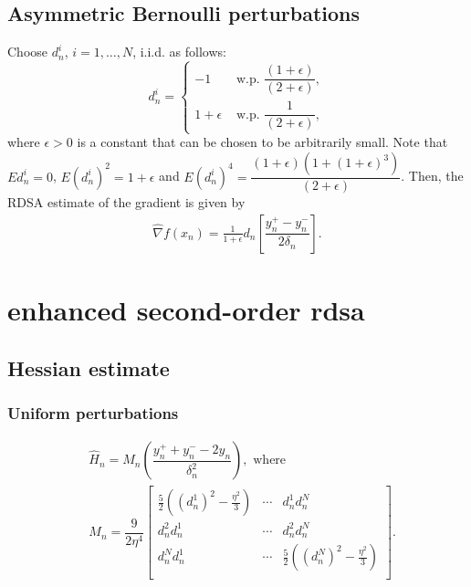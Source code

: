 \documentclass[letterpaper, 10 pt, conference]{ieeeconf}  %
\begin{document}
\subsection*{\textbf{Asymmetric Bernoulli perturbations}}
Choose $d_n^i$, $i=1,\ldots,N$, i.i.d. as follows: 
\begin{equation}
\label{eq:det-proj}
 d_n^i =
  \begin{cases}
   -1 &  \text{ w.p. } \dfrac{(1+\epsilon)}{(2+\epsilon)}, \\
   1+\epsilon &  \text{ w.p. } \dfrac{1}{(2+\epsilon)},
  \end{cases}
\end{equation}
where $\epsilon>0$ is a constant that can be chosen to be arbitrarily small.
Note that $E d_n^i = 0$, $E (d_n^i)^2 = 1+\epsilon$ and $E (d_n^i)^4 = \dfrac{(1+\epsilon)(1+(1+\epsilon)^3)}{(2+\epsilon)}$.
Then, the RDSA estimate of the gradient is given by
\begin{align}
\label{eq:grad-ber}
\widehat\nabla f(x_n) = \frac1{1+\epsilon} d_n \left[ \dfrac{y_n^+ - y_n^-}{2\delta_n}\right].
\end{align}



\section{enhanced second-order rdsa} \label{sec:e2rdsa}


\subsection{Hessian estimate}

\subsubsection*{\textbf{Uniform perturbations}}

\begin{align}
\label{eq:2rdsa-estimate-unif}
&\widehat H_n =  M_n \left(\dfrac{y_n^+ + y_n^- - 2 y_n}{\delta_n^2}\right), \text{ where } \\
& M_n =
\dfrac{9}{2\eta^4}\left[
\begin{array}{cccc}
\frac{5}{2}\left((d_n^1)^2-\frac{\eta^2}{3}\right) & \cdots & d_n^1 d_n^N\\
d_n^2 d_n^1  &  \cdots & d_n^2 d_n^N\\
d_n^N d_n^1 & \cdots &  \frac{5}{2}\left((d_n^N)^2-\frac{\eta^2}{3}\right) \\
\end{array}
\right].\nonumber
\end{align}
\end{document}
